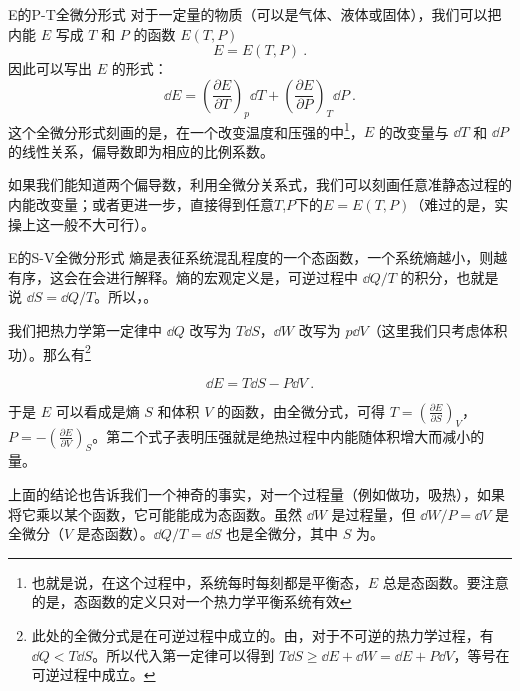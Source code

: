 \begin{example}{E的P-T全微分形式}
对于一定量的物质（可以是气体、液体或固体），我们可以把内能 $E$ 写成 $T$ 和 $P$ 的函数 $E(T,P)$
\begin{equation}
E=E(T,P)~.
\end{equation}
因此可以写出 $E$ 的形式：
\begin{equation}
\dd E=\left(\frac{\partial E}{\partial T}\right)_p \dd T + \left(\frac{\partial E}{\partial P}\right)_T \dd P~.
\end{equation}
这个全微分形式刻画的是，在一个改变温度和压强的中\footnote{也就是说，在这个过程中，系统每时每刻都是平衡态，$E$ 总是态函数。要注意的是，态函数的定义只对一个热力学平衡系统有效}，$E$ 的改变量与 $\dd T$ 和 $\dd P$ 的线性关系，偏导数即为相应的比例系数。

如果我们能知道两个偏导数，利用全微分关系式，我们可以刻画任意准静态过程的内能改变量；或者更进一步，直接得到任意$T$,$P$下的$E=E(T,P)$（难过的是，实操上这一般不大可行）。
\end{example}

\begin{example}{E的S-V全微分形式}
熵是表征系统混乱程度的一个态函数，一个系统熵越小，则越有序，这会在会进行解释。熵的宏观定义是，可逆过程中 $\dd Q/T$ 的积分，也就是说 $\dd S=\dd Q/T$。所以，。

我们把热力学第一定律中 $\dd Q$ 改写为 $T\dd S$，$\dd W$ 改写为 $p\dd V$（这里我们只考虑体积功）。那么有\footnote{
此处的全微分式是在可逆过程中成立的。由，对于不可逆的热力学过程，有 $\dd Q<T\dd S$。所以代入第一定律可以得到 $T\dd S\ge \dd E+\dd W=\dd E+P\dd V$，等号在可逆过程中成立。
}

\begin{equation}
\dd E=T\dd S-P\dd V~.
\end{equation}

于是 $E$ 可以看成是熵 $S$ 和体积 $V$ 的函数，由全微分式，可得 $T=\left(\frac{\partial E}{\partial S}\right)_V$，$P=-\left(\frac{\partial E}{\partial V}\right)_S$。第二个式子表明压强就是绝热过程中内能随体积增大而减小的量。

上面的结论也告诉我们一个神奇的事实，对一个过程量（例如做功，吸热），如果将它乘以某个函数，它可能能成为态函数。虽然 $\dd W$ 是过程量，但 $\dd W/P=\dd V$ 是全微分（$V$ 是态函数）。$\dd Q/T=\dd S$ 也是全微分，其中 $S$ 为。
\end{example}

